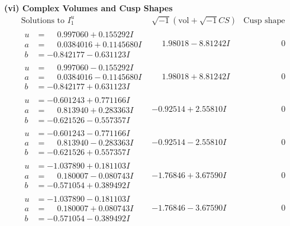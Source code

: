 \documentclass[1p]{elsarticle_modified}
\theoremstyle{definition}
\newcommand{\I}{\sqrt{-1}}
\begin{document}
\newpage\flushleft \textbf{(vi) Complex Volumes and Cusp Shapes}
$$\begin{array}{c|c|c}  
\text{Solutions to }I^u_{1}& \I (\text{vol} + \sqrt{-1}CS) & \text{Cusp shape}\\
 \hline 
\begin{aligned}
u &= \phantom{-}0.997060 + 0.155292 I \\
a &= \phantom{-}0.0384016 + 0.1145680 I \\
b &= -0.842177 - 0.631123 I\end{aligned}
 & \phantom{-}1.98018 - 8.81242 I & \phantom{-0.000000 } 0 \\ \hline\begin{aligned}
u &= \phantom{-}0.997060 - 0.155292 I \\
a &= \phantom{-}0.0384016 - 0.1145680 I \\
b &= -0.842177 + 0.631123 I\end{aligned}
 & \phantom{-}1.98018 + 8.81242 I & \phantom{-0.000000 } 0 \\ \hline\begin{aligned}
u &= -0.601243 + 0.771166 I \\
a &= \phantom{-}0.813940 + 0.283363 I \\
b &= -0.621526 - 0.557357 I\end{aligned}
 & -0.92514 + 2.55810 I & \phantom{-0.000000 } 0 \\ \hline\begin{aligned}
u &= -0.601243 - 0.771166 I \\
a &= \phantom{-}0.813940 - 0.283363 I \\
b &= -0.621526 + 0.557357 I\end{aligned}
 & -0.92514 - 2.55810 I & \phantom{-0.000000 } 0 \\ \hline\begin{aligned}
u &= -1.037890 + 0.181103 I \\
a &= \phantom{-}0.180007 - 0.080743 I \\
b &= -0.571054 + 0.389492 I\end{aligned}
 & -1.76846 + 3.67590 I & \phantom{-0.000000 } 0 \\ \hline\begin{aligned}
u &= -1.037890 - 0.181103 I \\
a &= \phantom{-}0.180007 + 0.080743 I \\
b &= -0.571054 - 0.389492 I\end{aligned}
 & -1.76846 - 3.67590 I & \phantom{-0.000000 } 0 \\ \hline\begin{aligned}

\end{aligned}
\end{array}$$
\end{document}
